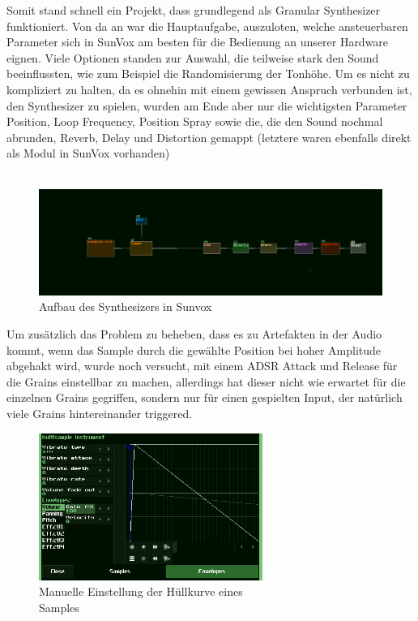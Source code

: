 \documentclass[12pt]{scrartcl}%
\theoremstyle{nonumberplain}
\begin{document}
\noindent Somit stand schnell ein Projekt, dass grundlegend als Granular Synthesizer funktioniert. Von da an war die Hauptaufgabe, auszuloten, welche ansteuerbaren Parameter sich in SunVox am besten für die Bedienung an unserer Hardware eignen. Viele Optionen standen zur Auswahl, die teilweise stark den Sound beeinflussten, wie zum Beispiel die Randomisierung der Tonhöhe. Um es nicht zu kompliziert zu halten, da es ohnehin mit einem gewissen Anspruch verbunden ist, den Synthesizer zu spielen, wurden am Ende aber nur die wichtigsten Parameter Position, Loop Frequency, Position Spray sowie die, die den Sound nochmal abrunden, Reverb, Delay und Distortion gemappt (letztere waren ebenfalls direkt als Modul in SunVox vorhanden)
\\\\
\begin{figure}[h]
\includegraphics[width=\textwidth]{sunvox_2}
  \caption{Aufbau des Synthesizers in Sunvox}
\end{figure}
\newpage
\noindent Um zusätzlich das Problem zu beheben, dass es zu Artefakten in der Audio kommt, wenn das Sample durch die gewählte Position bei hoher Amplitude abgehakt wird, wurde noch versucht, mit einem ADSR Attack und Release für die Grains einstellbar zu machen, allerdings hat dieser nicht wie erwartet für die einzelnen Grains gegriffen, sondern nur für einen gespielten Input, der natürlich viele Grains hintereinander triggered.\\
\begin{figure}
  \centering
  \includegraphics[width=0.65\textwidth]{sunvox_5}
  \caption{Manuelle Einstellung der Hüllkurve eines\\Samples}
\end{figure}
\end{document}
